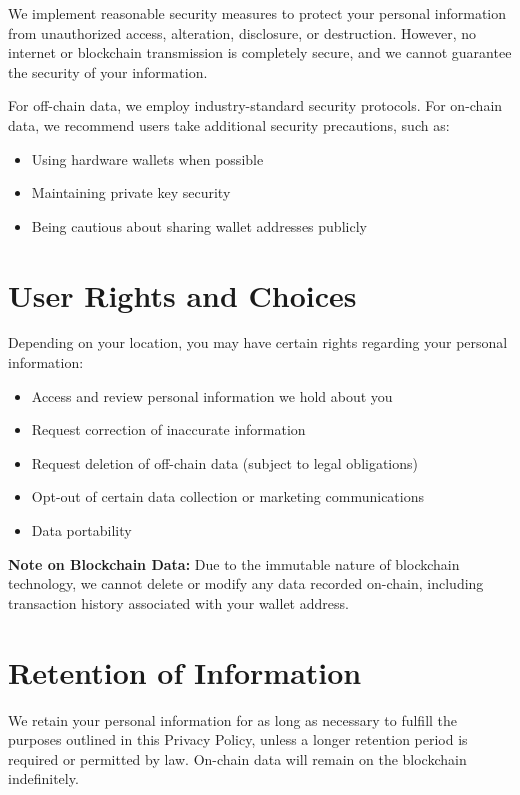 \documentclass[12pt]{article}
\begin{document}
We implement reasonable security measures to protect your personal information from unauthorized access, alteration, disclosure, or destruction. However, no internet or blockchain transmission is completely secure, and we cannot guarantee the security of your information.

For off-chain data, we employ industry-standard security protocols. For on-chain data, we recommend users take additional security precautions, such as:

\begin{itemize}
    \item Using hardware wallets when possible
    \item Maintaining private key security
    \item Being cautious about sharing wallet addresses publicly
\end{itemize}

\section{User Rights and Choices}

Depending on your location, you may have certain rights regarding your personal information:

\begin{itemize}
    \item Access and review personal information we hold about you
    \item Request correction of inaccurate information
    \item Request deletion of off-chain data (subject to legal obligations)
    \item Opt-out of certain data collection or marketing communications
    \item Data portability
\end{itemize}

\textbf{Note on Blockchain Data:} Due to the immutable nature of blockchain technology, we cannot delete or modify any data recorded on-chain, including transaction history associated with your wallet address.

\section{Retention of Information}

We retain your personal information for as long as necessary to fulfill the purposes outlined in this Privacy Policy, unless a longer retention period is required or permitted by law. On-chain data will remain on the blockchain indefinitely.
\end{document}
